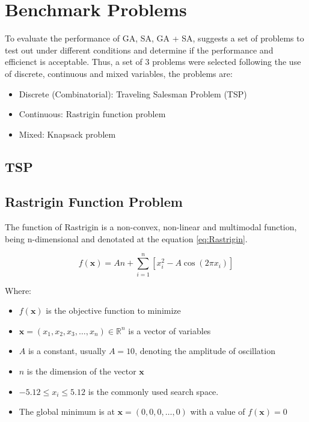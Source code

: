 \section*{Benchmark Problems}


  To evaluate the performance of GA, SA, GA + SA, \cite{yang2010introduction} suggests a set of
  problems to test out under different conditions and determine if the performance and efficienct
  is acceptable. Thus, a set of 3 problems were selected following the use of discrete, continuous
  and mixed variables, the problems are:
  \begin{itemize}
    \item Discrete (Combinatorial): Traveling Salesman Problem (TSP) \cite{bellmore1968traveling}
    \item Continuous: Rastrigin function problem \cite{rastrigin1974extremal}
    \item Mixed: Knapsack problem 
  \end{itemize}

  \subsection*{TSP}  \blindtext
  \subsection*{Rastrigin Function Problem}
    The function of Rastrigin is a non-convex, non-linear and multimodal function, being n-dimensional 
    and denotated at the equation \ref{eq:Rastrigin}.
  
    \begin{equation}
      \label{eq:Rastrigin}
      f(\mathbf{x}) = An + \sum_{i=1}^{n} \left[ x_i^2 - A\cos(2\pi x_i) \right]
    \end{equation}

    Where: 
    \begin{itemize} 
      \item $f(\mathbf{x})$ is the objective function to minimize 
      \item $\mathbf{x} = (x_1, x_2, x_3, \ldots, x_n) \in \mathbb{R}^n$ is a vector of variables 
      \item $A$ is a constant, usually $A = 10$, denoting the amplitude of oscillation 
      \item $n$ is the dimension of the vector $\mathbf{x}$ 
      \item $ -5.12 \leq x_i \leq 5.12$ is the commonly used search space. 
      \item The global minimum is at $\mathbf{x} = (0, 0, 0, \ldots, 0)$ with a value of $f(\mathbf{x}) = 0$ 
    \end{itemize}

